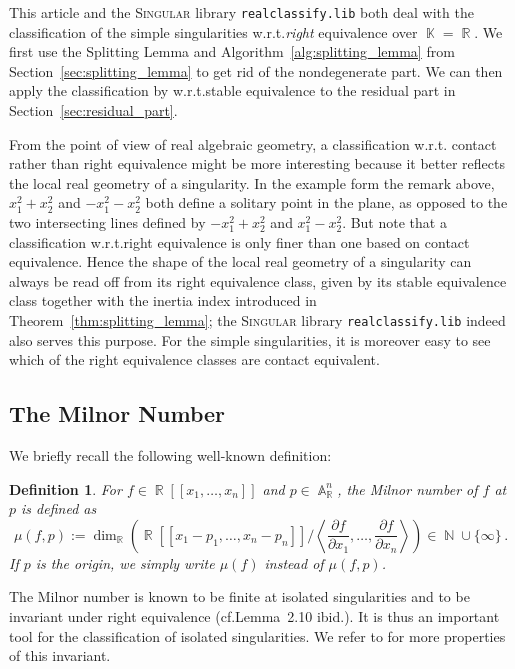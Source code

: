 \documentclass[noend]{amsproc}
\newtheorem{defn}[theorem]{Definition}
\theoremstyle{definition}
\newcommand{\Singular}{\textsc{Singular}}
\newcommand{\realclassify}{\texttt{realclassify.lib}}
\DeclareMathOperator{\N}{\mathbb{N}}
\DeclareMathOperator{\R}{\mathbb{R}}
\DeclareMathOperator{\K}{\mathbb{K}}
\DeclareMathOperator{\A}{\mathbb{A}}
\begin{document}
This article and the \Singular{} library \realclassify{} both deal with the
classification of the simple singularities w.r.t.\@ \emph{right} equivalence
over $\K = \R$. We first use the Splitting Lemma and
Algorithm~\ref{alg:splitting_lemma} from Section~\ref{sec:splitting_lemma} to
get rid of the nondegenerate part. We can then apply the classification by
\citet{AVG1985} w.r.t.\@ stable equivalence to the residual part in
Section~\ref{sec:residual_part}.

From the point of view of real algebraic geometry, a classification w.r.t.\@
contact rather than right equivalence might be more interesting because it
better reflects the local real geometry of a singularity. In the example form
the remark above, $x_1^2+x_2^2$ and $-x_1^2-x_2^2$ both define a solitary point
in the plane, as opposed to the two intersecting lines defined by
$-x_1^2+x_2^2$ and $x_1^2-x_2^2$. But note that a classification w.r.t.\@ right
equivalence is only finer than one based on contact equivalence. Hence the
shape of the local real geometry of a singularity can always be read off from
its right equivalence class, given by its stable equivalence class together
with the inertia index introduced in Theorem~\ref{thm:splitting_lemma}; the
\Singular{} library \realclassify{} indeed also serves this purpose. For the
simple singularities, it is moreover easy to see which of the right equivalence
classes are contact equivalent.


\subsection{The Milnor Number}%
\label{subsec:milnor_number}

We briefly recall the following well-known definition:

\begin{defn}
For $f \in \R[[x_1,\ldots,x_n]]$ and $p \in \A_{\R}^n$, the
\emph{Milnor number} of $f$ at $p$ is defined as
\[
\mu(f, p) := \dim_{\R}
\left( \R[[x_1-p_1, \ldots, x_n-p_n]] \bigg/
\left\langle \frac{\partial f}{\partial x_1}, \ldots,
\frac{\partial f}{\partial x_n} \right\rangle \right)
\in \N \cup \{\infty\} \,.
\]
If $p$ is the origin, we simply write $\mu(f)$ instead of $\mu(f, p)$.
\end{defn}

The Milnor number is known to be finite at isolated singularities
\citep[cf.\@][Chapter~I, Lemma~2.3]{GLS2007} and to be invariant under right
equivalence
(cf.\@ Lemma~2.10 ibid.). It is thus an important tool for the classification
of isolated singularities. We refer to \citet{GLS2007} for more properties of
this invariant.
\end{document}
